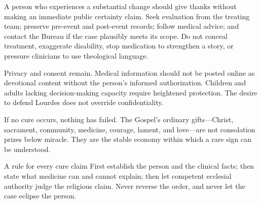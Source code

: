 A person who experiences a substantial change should give thanks without making an immediate public certainty claim. Seek evaluation from the treating team; preserve pre-event and post-event records; follow medical advice; and contact the Bureau if the case plausibly meets its scope. Do not conceal treatment, exaggerate disability, stop medication to strengthen a story, or pressure clinicians to use theological language.

Privacy and consent remain. Medical information should not be posted online as devotional content without the person's informed authorization. Children and adults lacking decision-making capacity require heightened protection. The desire to defend Lourdes does not override confidentiality.

If no cure occurs, nothing has failed. The Gospel's ordinary gifts---Christ, sacrament, community, medicine, courage, lament, and love---are not consolation prizes below miracle. They are the stable economy within which a rare sign can be understood.

\begin{studybox}{A rule for every cure claim}
First establish the person and the clinical facts; then state what medicine can and cannot explain; then let competent ecclesial authority judge the religious claim. Never reverse the order, and never let the case eclipse the person.
\end{studybox}
